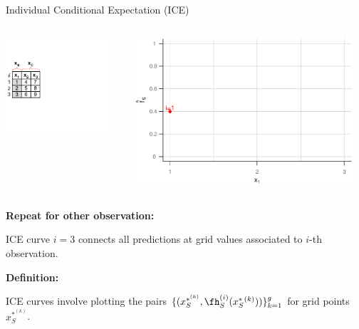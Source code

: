 \documentclass[11pt,compress,t,notes=noshow, aspectratio=169, xcolor=table]{beamer}
\begin{document}
\begin{frame}{Individual Conditional Expectation (ICE)}

\begin{columns}[T]
\begin{column}{0.4\textwidth}
\includegraphics[page=7, trim=0cm 0.35cm 0.85cm 0.35cm, width=0.9\textwidth]{figure_man/ice_plot_demo}
\end{column}
\begin{column}{0.55\textwidth}
\includegraphics[page=5, width=0.95\textwidth]{figure/ICE}
\end{column}
\end{columns}

\textbf{Repeat for other observation:}

ICE curve $i=3$ connects all predictions at grid values associated to $i$-th observation.

\textbf{Definition:}

ICE curves involve plotting the pairs $ \{(x_S^{*^{(k)}}, \fh_{S}^{(i)}(x_S^*{^{(k)}})) \}_{k=1}^g $ for grid points $x_S^{*^{(k)}}$.
\end{frame}
\end{document}
